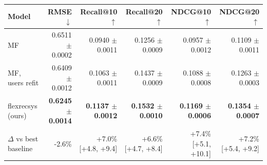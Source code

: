\begin{tabular}{lrrrrr}
\toprule
Model & RMSE $\downarrow$ & Recall@10 $\uparrow$ & Recall@20 $\uparrow$ & NDCG@10 $\uparrow$ & NDCG@20 $\uparrow$ \\
\midrule
MF & 0.6511 $\pm$ 0.0002 & 0.0940 $\pm$ 0.0011 & 0.1256 $\pm$ 0.0009 & 0.0957 $\pm$ 0.0012 & 0.1109 $\pm$ 0.0011 \\
MF, users refit & 0.6409 $\pm$ 0.0012 & 0.1063 $\pm$ 0.0011 & 0.1437 $\pm$ 0.0009 & 0.1088 $\pm$ 0.0008 & 0.1263 $\pm$ 0.0003 \\
flexrecsys (ours) & \textbf{0.6245 $\pm$ 0.0014} & \textbf{0.1137 $\pm$ 0.0012} & \textbf{0.1532 $\pm$ 0.0010} & \textbf{0.1169 $\pm$ 0.0006} & \textbf{0.1354 $\pm$ 0.0007} \\
\midrule
$\Delta$ vs best baseline & -2.6\% & +7.0\% [+4.8, +9.4] & +6.6\% [+4.7, +8.4] & +7.4\% [+5.1, +10.1] & +7.2\% [+5.4, +9.2] \\
\bottomrule
\end{tabular}

